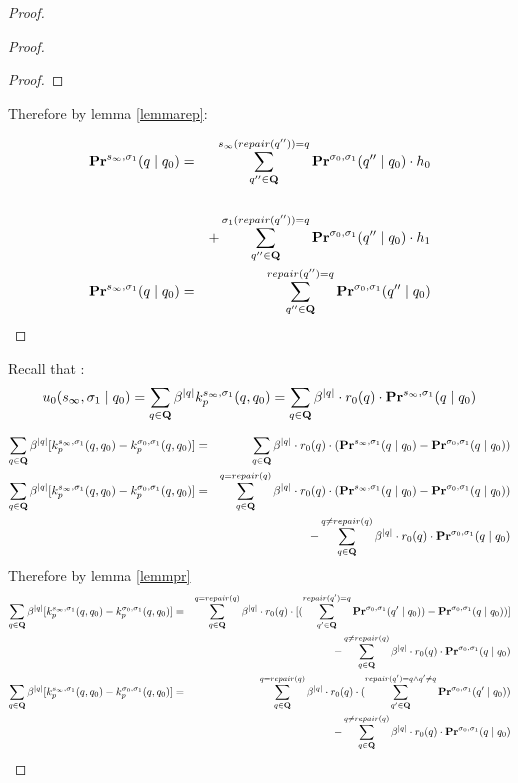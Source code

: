 \begin{proof}
\begin{proof}
\begin{proof}
			
			
		\end{proof}
		
		Therefore by lemma \ref{lemmarep}:
		
		\begin{eqnarray*}
			\mathbf{Pr}^{s_{\infty},\sigma_1}(q \mid q_0)  & =& \sum_{q''\in \mathbf{Q}}^{s_{\infty}(repair(q'')) = q} \mathbf{Pr}^{\sigma_0,\sigma_1}(q'' \mid q_0) \cdot h_0\\\\
			& & +  \sum_{q''\in \mathbf{Q}}^{\sigma_1(repair(q'')) = q} \mathbf{Pr}^{\sigma_0,\sigma_1}(q'' \mid q_0) \cdot h_1\\
			\mathbf{Pr}^{s_{\infty},\sigma_1}(q \mid q_0)  & =& \sum_{q''\in \mathbf{Q}}^{repair(q'') = q} \mathbf{Pr}^{\sigma_0,\sigma_1}(q'' \mid q_0) \\
		\end{eqnarray*}
	\end{proof}
	
	Recall that : $$u_0(s_{\infty},\sigma_1 \mid q_0) = 	\sum_{q \in \mathbf{Q}} \beta^{|q|} k^{s_{\infty},\sigma_1}_p(q,q_0) = \sum_{q \in \mathbf{Q}} \beta^{|q|} \cdot r_0(q)\cdot \mathbf{Pr}^{s_{\infty},\sigma_1}(q \mid q_0) $$
	
	\begin{eqnarray*}
		\sum_{q \in \mathbf{Q}} \beta^{|q|} [k^{s_{\infty},\sigma_1}_p(q,q_0)- k^{\sigma_0,\sigma_1}_p(q,q_0) ]& = & \sum_{q \in \mathbf{Q}} \beta^{|q|} \cdot r_0(q)\cdot (\mathbf{Pr}^{s_{\infty},\sigma_1}(q \mid q_0)- \mathbf{Pr}^{\sigma_0,\sigma_1}(q \mid q_0) )\\
		\sum_{q \in \mathbf{Q}} \beta^{|q|} [k^{s_{\infty},\sigma_1}_p(q,q_0)- k^{\sigma_0,\sigma_1}_p(q,q_0) ] & = & \sum_{q \in \mathbf{Q}}^{q = repair(q)} \beta^{|q|} \cdot r_0(q)\cdot (\mathbf{Pr}^{s_{\infty},\sigma_1}(q \mid q_0)- \mathbf{Pr}^{\sigma_0,\sigma_1}(q \mid q_0) )\\
		&& - \sum_{q \in \mathbf{Q}}^{q \neq repair(q)} \beta^{|q|} \cdot r_0(q)\cdot\mathbf{Pr}^{\sigma_0,\sigma_1}(q \mid q_0) \\
	\end{eqnarray*}
	Therefore by lemma \ref{lemmpr}
	\begin{eqnarray*}
		\sum_{q \in \mathbf{Q}} \beta^{|q|} [k^{s_{\infty},\sigma_1}_p(q,q_0)- k^{\sigma_0,\sigma_1}_p(q,q_0) ] & = & \sum_{q \in \mathbf{Q}}^{q = repair(q)} \beta^{|q|} \cdot r_0(q)\cdot [(\sum_{q'\in \mathbf{Q}}^{repair(q') = q} \mathbf{Pr}^{\sigma_0,\sigma_1}(q' \mid q_0))- \mathbf{Pr}^{\sigma_0,\sigma_1}(q \mid q_0) )]\\
		&& - \sum_{q \in \mathbf{Q}}^{q \neq repair(q)} \beta^{|q|} \cdot r_0(q)\cdot\mathbf{Pr}^{\sigma_0,\sigma_1}(q \mid q_0) \\
		\sum_{q \in \mathbf{Q}} \beta^{|q|} [k^{s_{\infty},\sigma_1}_p(q,q_0)- k^{\sigma_0,\sigma_1}_p(q,q_0) ] & = & \sum_{q \in \mathbf{Q}}^{q = repair(q)} \beta^{|q|} \cdot r_0(q)\cdot (\sum_{q'\in \mathbf{Q}}^{repair(q') = q \land q' \neq q} \mathbf{Pr}^{\sigma_0,\sigma_1}(q' \mid q_0))\\
		&& - \sum_{q \in \mathbf{Q}}^{q \neq repair(q)} \beta^{|q|} \cdot r_0(q)\cdot\mathbf{Pr}^{\sigma_0,\sigma_1}(q \mid q_0) \\
	\end{eqnarray*}
	

\end{proof}

